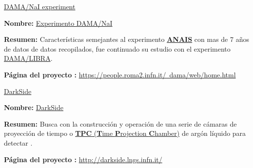 


\href{https://en.wikipedia.org/wiki/DAMA/NaI}{DAMA/NaI experiment}
\begin{itemize_f}
\item \textbf{Nombre:} \href{https://en.wikipedia.org/wiki/DAMA/NaI}{Experimento DAMA/NaI}
\item \textbf{Resumen:} Características semejantes al experimento \href{https://en.wikipedia.org/wiki/ANAIS}{\textbf{ANAIS}} con mas de 7 años de datos de datos recopilados, fue continuado su estudio con el experimento \href{https://en.wikipedia.org/wiki/DAMA/LIBRA}{DAMA/LIBRA}.
\item \textbf{Página del proyecto :} \href{https://people.roma2.infn.it/~dama/web/home.html}{https://people.roma2.infn.it/~dama/web/home.html}
\end{itemize_f}

\href{https://en.wikipedia.org/wiki/DarkSide}{DarkSide}
\begin{itemize_f}
\item \textbf{Nombre:} \href{https://en.wikipedia.org/wiki/DarkSide}{DarkSide}
\item \textbf{Resumen:} Busca con la construcción y operación de una serie de cámaras de proyección de tiempo o \href{https://en.wikipedia.org/wiki/Time_projection_chamber}{\textbf{TPC} (\textbf{T}ime \textbf{P}rojection \textbf{C}hamber)} de argón líquido para detectar \WIMPs. 
\item \textbf{Página del proyecto :} \href{http://darkside.lngs.infn.it/}{http://darkside.lngs.infn.it/}
\end{itemize_f}

